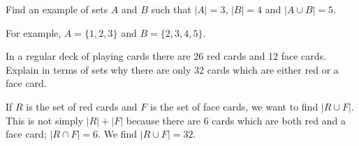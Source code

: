 \begin{questions}
  
  

\question Find an example of sets $A$ and $B$ such that $|A| = 3$, $|B| = 4$ and $|A \cup B| = 5$.

  \begin{answer}
    For example, $A = \{1,2,3\}$ and $B = \{2,3,4,5\}$.
  \end{answer}



\question In a regular deck of playing cards there are 26 red cards and 12 face cards.  Explain in terms of sets why there are only 32 cards which are either red or a face card.

  \begin{answer}
      If $R$ is the set of red cards and $F$ is the set of face cards, we want to find $|R \cup F|$.  This is not simply $|R| + |F|$ because there are 6 cards which are both red and a face card; $|R \cap F| = 6$.  We find $|R \cup F| = 32$.
  \end{answer}


  
% 
% 
% 
% 
% 
% 
% 
% 
% 



  


\end{questions}
